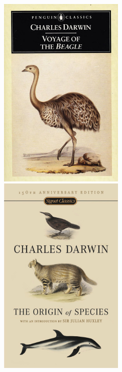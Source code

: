\documentclass[10pt]{beamer}
\begin{document}
\begin{frame}
	\begin{columns}
		\begin{column}{0.5\textwidth}
			\begin{center}
				\includegraphics[width=0.45\textwidth]{figures/book1.jpg}\\
				\vspace{0.25cm}
				\includegraphics[width=0.45\textwidth]{figures/book2.jpg}
			\end{center}
		\end{column}
		

\end{columns}
\end{frame}
\end{document}
